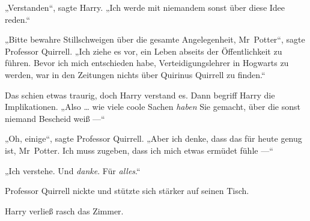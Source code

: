 „Verstanden“, sagte Harry.
„Ich werde mit niemandem sonst über diese Idee reden.“

„Bitte bewahre Stillschweigen über die gesamte Angelegenheit, Mr~Potter“, sagte Professor Quirrell.
„Ich ziehe es vor, ein Leben abseits der Öffentlichkeit zu führen. Bevor ich mich entschieden habe, Verteidigungslehrer in Hogwarts zu werden, war in den Zeitungen nichts über Quirinus Quirrell zu finden.“

Das schien etwas traurig, doch Harry verstand es. Dann begriff Harry die Implikationen.
„Also … wie viele coole Sachen \emph{haben} Sie gemacht, über die sonst niemand Bescheid weiß —“

„Oh, einige“, sagte Professor Quirrell.
„Aber ich denke, dass das für heute genug ist, Mr~Potter. Ich muss zugeben, dass ich mich etwas ermüdet fühle —“

„Ich verstehe. Und \emph{danke}. Für \emph{alles}.“

Professor Quirrell nickte und stützte sich stärker auf seinen Tisch.

Harry verließ rasch das Zimmer.

